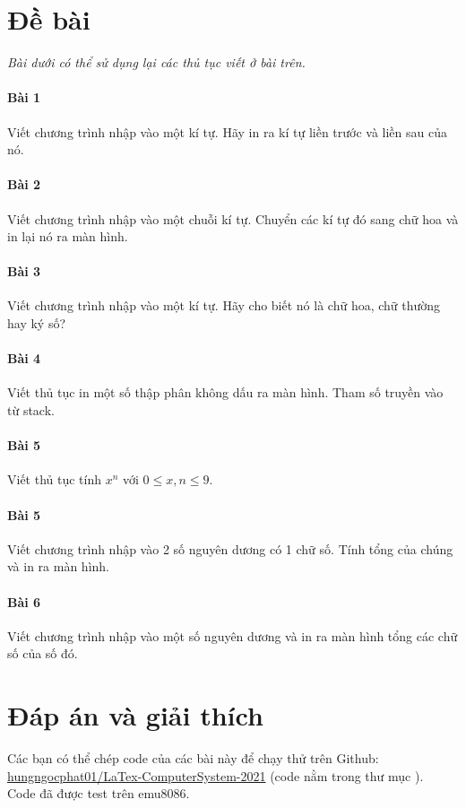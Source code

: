 \documentclass[main.tex]{subfiles}
\begin{document}
\newcommand{\textD}{\textcolor{OliveGreen}{\cd{Đ}}}
\newcommand{\textS}{\textcolor{red}{\cd{S}}}

\section{Đề bài}
\textit{Bài dưới có thể sử dụng lại các thủ tục viết ở bài trên.}
\paragraph{Bài 1} Viết chương trình nhập vào một kí tự. Hãy in ra kí tự liền trước và liền sau của nó.
\paragraph{Bài 2} Viết chương trình nhập vào một chuỗi kí tự. Chuyển các kí tự đó sang chữ hoa và in lại nó ra màn hình.
\paragraph{Bài 3} Viết chương trình nhập vào một kí tự. Hãy cho biết nó là chữ hoa, chữ thường hay ký số?
\paragraph{Bài 4} Viết thủ tục in một số thập phân không dấu ra màn hình. Tham số truyền vào từ stack.
\paragraph{Bài 5} Viết thủ tục tính $x^n$ với $0\le x, n \le 9$.
\paragraph{Bài 5} Viết chương trình nhập vào 2 số nguyên dương có 1 chữ số. Tính tổng của chúng và in ra màn hình.
\paragraph{Bài 6} Viết chương trình nhập vào một số nguyên dương và in ra màn hình tổng các chữ số của số đó.
\pagebreak

\section{Đáp án và giải thích}
Các bạn có thể chép code của các bài này để chạy thử trên Github: \href{https://github.com/hungngocphat01/LaTex-ComputerSystem-2021}{hungngocphat01/LaTex-ComputerSystem-2021} (code nằm trong thư mục ).\\
Code đã được test trên emu8086.
\renewcommand{\fcolorbox}[4][]{#4}
\end{document}
